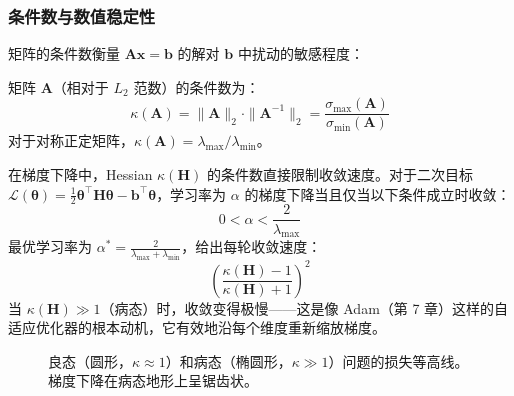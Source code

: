 \subsubsection{条件数与数值稳定性}

矩阵的条件数衡量 $\mathbf{A}\mathbf{x} = \mathbf{b}$ 的解对 $\mathbf{b}$ 中扰动的敏感程度：

\begin{定义}[条件数]
矩阵 $\mathbf{A}$（相对于 $L_2$ 范数）的条件数为：
\begin{equation}
\kappa(\mathbf{A}) = \|\mathbf{A}\|_2 \cdot \|\mathbf{A}^{-1}\|_2 = \frac{\sigma_{\max}(\mathbf{A})}{\sigma_{\min}(\mathbf{A})}
\end{equation}
对于对称正定矩阵，$\kappa(\mathbf{A}) = \lambda_{\max} / \lambda_{\min}$。
\end{定义}

在梯度下降中，Hessian $\kappa(\mathbf{H})$ 的条件数直接限制收敛速度。对于二次目标 $\mathcal{L}(\boldsymbol{\theta}) = \frac{1}{2}\boldsymbol{\theta}^\top \mathbf{H}\boldsymbol{\theta} - \mathbf{b}^\top\boldsymbol{\theta}$，学习率为 $\alpha$ 的梯度下降当且仅当以下条件成立时收敛：
\begin{equation}
0 < \alpha < \frac{2}{\lambda_{\max}}
\end{equation}
最优学习率为 $\alpha^* = \frac{2}{\lambda_{\max} + \lambda_{\min}}$，给出每轮收敛速度：
\begin{equation}
\left(\frac{\kappa(\mathbf{H}) - 1}{\kappa(\mathbf{H}) + 1}\right)^2
\end{equation}
当 $\kappa(\mathbf{H}) \gg 1$（病态）时，收敛变得极慢——这是像 Adam（第 7 章）这样的自适应优化器的根本动机，它有效地沿每个维度重新缩放梯度。

\begin{figure}[htbp]
    \centering
    \caption[条件数与损失等高线]{良态（圆形，$\kappa \approx 1$）和病态（椭圆形，$\kappa \gg 1$）问题的损失等高线。梯度下降在病态地形上呈锯齿状。}
    \label{fig:condition_number}
\end{figure}

